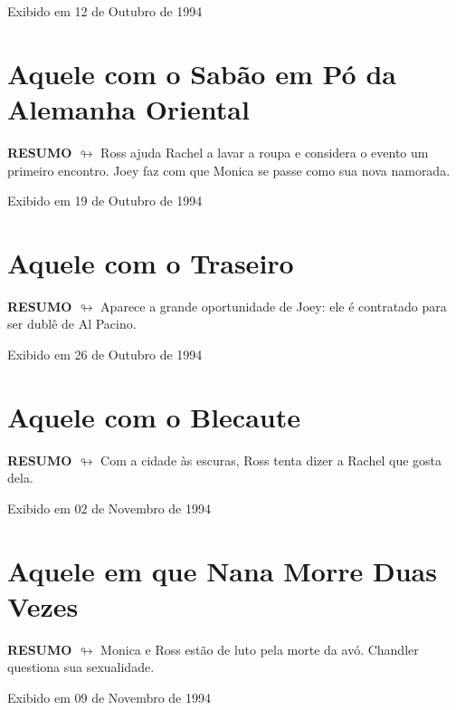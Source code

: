 \begin{flushright}
\textcolor{gray600}{Exibido em 12 de Outubro de 1994}
\end{flushright}


\chapter{Aquele com o Sabão em Pó da Alemanha Oriental}

\textbf{RESUMO $\looparrowright$} Ross ajuda Rachel a lavar a roupa e considera o evento um primeiro encontro. Joey faz com que Monica se passe como sua nova namorada.

\begin{flushright}
\textcolor{gray600}{Exibido em 19 de Outubro de 1994}
\end{flushright}


\chapter{Aquele com o Traseiro}

\textbf{RESUMO $\looparrowright$} Aparece a grande oportunidade de Joey: ele é contratado para ser dublê de Al Pacino.

\begin{flushright}
\textcolor{gray600}{Exibido em 26 de Outubro de 1994}
\end{flushright}


\chapter{Aquele com o Blecaute}

\textbf{RESUMO $\looparrowright$} Com a cidade às escuras, Ross tenta dizer a Rachel que gosta dela.

\begin{flushright}
\textcolor{gray600}{Exibido em 02 de Novembro de 1994}
\end{flushright}


\chapter{Aquele em que Nana Morre Duas Vezes}

\textbf{RESUMO $\looparrowright$} Monica e Ross estão de luto pela morte da avó. Chandler questiona sua sexualidade.

\begin{flushright}
\textcolor{gray600}{Exibido em 09 de Novembro de 1994}
\end{flushright}


